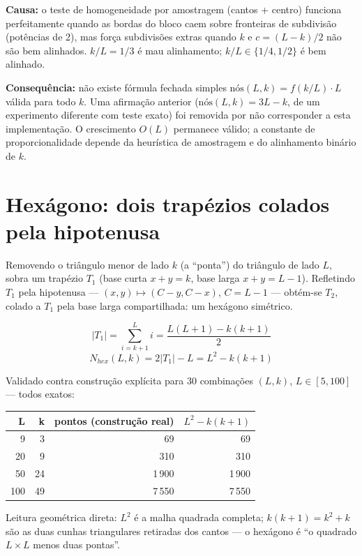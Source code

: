 \documentclass[11pt,a4paper]{article}
\begin{document}
\textbf{Causa:} o teste de homogeneidade por amostragem (cantos + centro) funciona perfeitamente quando as bordas do bloco caem sobre fronteiras de subdivisão (potências de 2), mas força subdivisões extras quando $k$ e $c=(L-k)/2$ não são bem alinhados. $k/L=1/3$ é mau alinhamento; $k/L \in \{1/4, 1/2\}$ é bem alinhado.

\textbf{Consequência:} não existe fórmula fechada simples $\text{nós}(L,k) = f(k/L) \cdot L$ válida para todo $k$. Uma afirmação anterior ($\text{nós}(L,k) = 3L-k$, de um experimento diferente com teste exato) foi removida por não corresponder a esta implementação. O crescimento $O(L)$ permanece válido; a constante de proporcionalidade depende da heurística de amostragem e do alinhamento binário de $k$.

\section{Hexágono: dois trapézios colados pela hipotenusa}

Removendo o triângulo menor de lado $k$ (a ``ponta'') do triângulo de lado $L$, sobra um trapézio $T_1$ (base curta $x+y=k$, base larga $x+y=L-1$). Refletindo $T_1$ pela hipotenusa --- $(x,y) \mapsto (C-y, C-x)$, $C=L-1$ --- obtém-se $T_2$, colado a $T_1$ pela base larga compartilhada: um hexágono simétrico.

\[
|T_1| = \sum_{i=k+1}^{L} i = \frac{L(L+1) - k(k+1)}{2}
\]
\[
N_{hex}(L,k) = 2|T_1| - L = L^2 - k(k+1)
\]

Validado contra construção explícita para 30 combinações $(L,k)$, $L \in [5,100]$ --- todos exatos:

\begin{table}[h]
\centering
\begin{tabular}{rrrr}
\toprule
L & k & pontos (construção real) & $L^2 - k(k+1)$ \\
\midrule
9   & 3  & 69    & 69 \\
20  & 9  & 310   & 310 \\
50  & 24 & 1\,900 & 1\,900 \\
100 & 49 & 7\,550 & 7\,550 \\
\bottomrule
\end{tabular}
\end{table}

Leitura geométrica direta: $L^2$ é a malha quadrada completa; $k(k+1) = k^2+k$ são as duas cunhas triangulares retiradas dos cantos --- o hexágono é ``o quadrado $L \times L$ menos duas pontas''.
\end{document}
